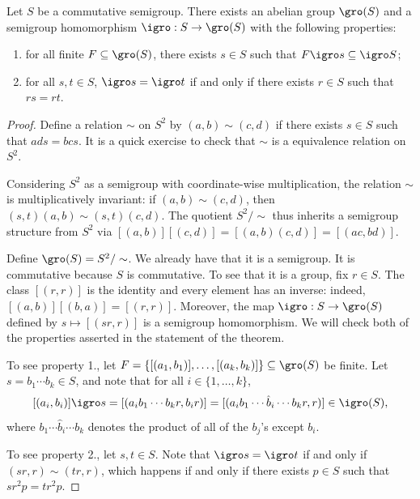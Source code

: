 
\begin{theorem}
\label{thm_gro_group_props}
    Let $S$ be a commutative semigroup.  There exists an abelian group $\gro(S)$ and a semigroup homomorphism $\igro: S \to \gro(S)$ with the following properties:
    \begin{enumerate}
        \item for all finite $F \subseteq \gro(S)$, there exists $s \in S$ such that $F \igro s \subseteq \igro S$;
        \item for all $s, t \in S$, $\igro s = \igro t$ if and only if there exists $r \in S$ such that $rs = rt$.
    \end{enumerate}
\end{theorem}

\begin{proof}
    Define a relation $\sim$ on $S^2$ by $(a,b) \sim (c,d)$ if there exists $s \in S$ such that $ads = bcs$.  It is a quick exercise to check that $\sim$ is a equivalence relation on $S^2$.
    
    Considering $S^2$ as a semigroup with coordinate-wise multiplication, the relation $\sim$ is multiplicatively invariant: if $(a,b) \sim (c,d)$, then $(s,t) (a,b) \sim (s,t) (c,d)$.
    The quotient $S^2 / \sim$ thus inherits a semigroup structure from $S^2$ via $[(a,b)] [(c,d)] = [(a,b) (c,d)] = [(ac,bd)]$.

    Define $\gro(S) = S^2 / \sim$.  We already have that it is a semigroup.  It is commutative because $S$ is commutative.  To see that it is a group, fix $r \in S$.  The class $[(r,r)]$ is the identity and every element has an inverse: indeed, $[(a,b)] [(b,a)] = [(r,r)]$.  Moreover, the map $\igro: S \to \gro(S)$ defined by $s \mapsto [(sr, r)]$ is a semigroup homomorphism.  We will check both of the properties asserted in the statement of the theorem.

    To see property 1., let $F = \{[(a_1, b_1)], \ldots, [(a_k, b_k)]\} \subseteq \gro(S)$ be finite. Let $s = b_1 \cdots b_k \in S$, and note that for all $i \in \{1, \ldots, k\}$,
    \[[(a_i, b_i)] \igro s = [(a_i b_1 \cdots b_k r, b_i r)] = [(a_i b_1 \cdots \hat b_i \cdots b_k r, r)] \in \igro(S),\]
    where $b_1 \cdots \hat b_i \cdots b_k$ denotes the product of all of the $b_j$'s except $b_i$.

    To see property 2., let $s, t \in S$.  Note that $\igro s = \igro t$ if and only if $(sr, r) \sim (tr, r)$, which happens if and only if there exists $p \in S$ such that $sr^2p = tr^2p$.
\end{proof}


